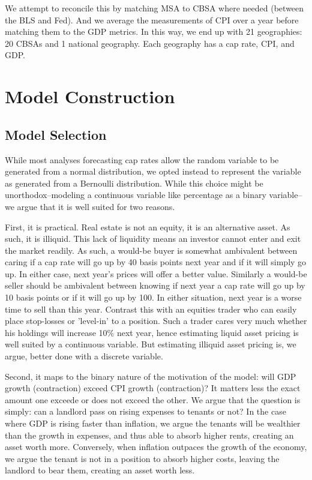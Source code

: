 We attempt to reconcile this by matching MSA to CBSA where needed (between the BLS and Fed). And we average the measurements of CPI over a year before matching them to the GDP metrics. In this way, we end up with 21 geographies: 20 CBSAs and 1 national geography. Each geography has a cap rate, CPI, and GDP. 
 
\section{Model Construction}

\subsection{Model Selection}
While most analyses forecasting cap rates allow the random variable to be generated from a normal distribution, we opted instead to represent the variable as generated from a Bernoulli distribution. While this choice might be unorthodox--modeling a continuous variable like percentage as a binary variable-- we argue that it is well suited for two reasons. 

First, it is practical. Real estate is not an equity, it is an alternative asset. As such, it is illiquid. This lack of liquidity means an investor cannot enter and exit the market readily. As such, a would-be buyer is somewhat ambivalent between caring if a cap rate will go up by 40 basis points next year and if it  will simply go up. In either case, next year's prices will offer a better value. Similarly a would-be seller should be ambivalent between knowing if next year a cap rate will go up by 10 basis points or if it will go up by 100. In either situation, next year is a worse time to sell than this year.  Contrast this with an equities trader who can easily place stop-losses or 'level-in' to a position. Such a trader cares very much whether his holdings will increase 10\% next year, hence estimating liquid asset pricing is well suited by a continuous variable. But estimating illiquid asset pricing is, we argue, better done with a discrete variable. 

Second, it maps to the binary nature of the motivation of the model: will GDP growth (contraction) exceed CPI growth (contraction)? It matters less the exact amount one exceede or does not exceed the other. We argue that the question is simply: can a landlord pass on rising expenses to tenants or not? In the case where GDP is rising faster than inflation, we argue the tenants will be wealthier than the growth in expenses, and thus able to absorb higher rents, creating an asset worth more. Conversely, when inflation outpaces the growth of the economy, we argue the tenant is not in a position to absorb higher costs, leaving the landlord to bear them, creating an asset worth less. 

